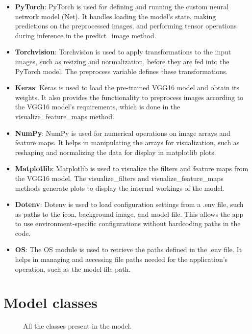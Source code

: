 \documentclass[a4paper,oneside,11pt]{book}
\begin{document}
\begin{itemize}
    \item \textbf{PyTorch}: PyTorch is used for defining and running the custom neural network model (Net). It handles loading the model's state, making predictions on the preprocessed images, and performing tensor operations during inference in the predict\_image method.
    \item \textbf{Torchvision}: Torchvision is used to apply transformations to the input images, such as resizing and normalization, before they are fed into the PyTorch model. The preprocess variable defines these transformations.
    \item \textbf{Keras}: Keras is used to load the pre-trained VGG16 model and obtain its weights. It also provides the functionality to preprocess images according to the VGG16 model's requirements, which is done in the visualize\_feature\_maps method.
    \item \textbf{NumPy}: NumPy is used for numerical operations on image arrays and feature maps. It helps in manipulating the arrays for visualization, such as reshaping and normalizing the data for display in matplotlib plots.
    \item \textbf{Matplotlib}: Matplotlib is used to visualize the filters and feature maps from the VGG16 model. The visualize\_filters and visualize\_feature\_maps methods generate plots to display the internal workings of the model.
    \item \textbf{Dotenv}: Dotenv is used to load configuration settings from a .env file, such as paths to the icon, background image, and model file. This allows the app to use environment-specific configurations without hardcoding paths in the code.
    \item \textbf{OS}: The OS module is used to retrieve the paths defined in the .env file. It helps in managing and accessing file paths needed for the application's operation, such as the model file path.
\end{itemize}
\section{Model classes}
\begin{figure}[H]
    \centering
    \caption{All the classes present in the model.}
\end{figure}
\end{document}
